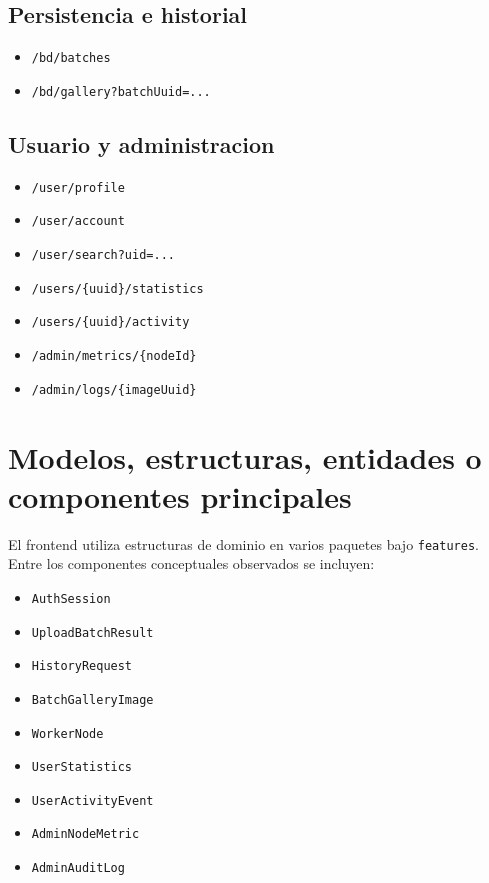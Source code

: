 \documentclass[conference]{IEEEtran}
\begin{document}
\subsection{Persistencia e historial}
\begin{itemize}[leftmargin=*]
\item \texttt{/bd/batches}
\item \texttt{/bd/gallery?batchUuid=...}
\end{itemize}

\subsection{Usuario y administracion}
\begin{itemize}[leftmargin=*]
\item \texttt{/user/profile}
\item \texttt{/user/account}
\item \texttt{/user/search?uid=...}
\item \texttt{/users/\{uuid\}/statistics}
\item \texttt{/users/\{uuid\}/activity}
\item \texttt{/admin/metrics/\{nodeId\}}
\item \texttt{/admin/logs/\{imageUuid\}}
\end{itemize}

\section{Modelos, estructuras, entidades o componentes principales}
El frontend utiliza estructuras de dominio en varios paquetes bajo \texttt{features}. Entre los componentes conceptuales observados se incluyen:

\begin{itemize}[leftmargin=*]
\item \texttt{AuthSession}
\item \texttt{UploadBatchResult}
\item \texttt{HistoryRequest}
\item \texttt{BatchGalleryImage}
\item \texttt{WorkerNode}
\item \texttt{UserStatistics}
\item \texttt{UserActivityEvent}
\item \texttt{AdminNodeMetric}
\item \texttt{AdminAuditLog}
\end{itemize}
\end{document}
